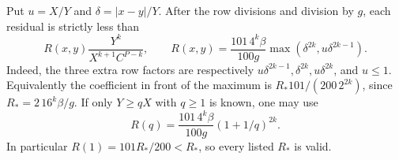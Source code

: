 \documentclass[12pt]{article}
\numberwithin{equation}{section}
\begin{document}
Put $u=X/Y$ and $\delta=|x-y|/Y$. After the row divisions and division
by $g$, each residual is strictly less than
\begin{equation}\label{eq:ff-point-residual}
 R(x,y)\frac{Y^k}{X^{k+1}C^{P-k}},\qquad
 R(x,y)=\frac{101\,4^k\beta}{100g}
             \max(\delta^{2k},u\delta^{2k-1}).
\end{equation}
Indeed, the three extra row factors are respectively
$u\delta^{2k-1},\delta^{2k},u\delta^{2k}$, and $u\le1$.
Equivalently the coefficient in front of the maximum is
$R_*101/(200\,2^{2k})$, since $R_*=2\,16^k\beta/g$.
If only $Y\ge qX$ with $q\ge1$ is known, one may use
\begin{equation}\label{eq:ff-ratio-residual}
 R(q)=\frac{101\,4^k\beta}{100g}(1+1/q)^{2k}.
\end{equation}
In particular $R(1)=101R_*/200<R_*$, so every listed $R_*$ is valid.
\end{document}

